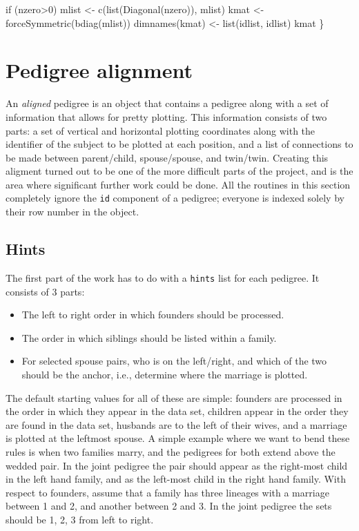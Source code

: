 \documentclass{article}
\begin{document}
    if (nzero>0) mlist <- c(list(Diagonal(nzero)), mlist)
    kmat <- forceSymmetric(bdiag(mlist))
    dimnames(kmat) <- list(idlist, idlist)
    kmat
\}
\nwendcode{}\nwdocspar




\section{Pedigree alignment}
An \emph{aligned} pedigree is an object that contains a pedigree along
with a set of information that allows for pretty plotting.
This information consists of two parts: 
a set of vertical and horizontal plotting coordinates along with the
identifier of the subject to be plotted at each position,
and a list of connections to be made between parent/child, spouse/spouse,
and twin/twin.
Creating this aligment turned out to be one of the more difficult parts
of the project, and is the area where significant further work could be
done.  
All the routines in this section completely ignore the {\tt{}id} component
of a pedigree; everyone is indexed solely by their row number in the object.

\subsection{Hints}

The first part of the work has to do with a {\tt{}hints} list for each
pedigree.  It consists of 3 parts:
\begin{itemize}
  \item The left to right order in which founders should be processed.
  \item The order in which siblings should be listed within a family.
  \item For selected spouse pairs, who is on the left/right, and which of the
    two should be the anchor, i.e., determine where the marriage is plotted.
    \end{itemize}
The default starting values for all of these are simple: founders are 
processed in the order in which they appear in the data set, 
children appear in the order they are found in the data set,
husbands are to the left of their wives, and a marriage is plotted
at the leftmost spouse.
A simple example where we want to bend these rules is when two families
marry, and the pedigrees for both extend above the wedded pair.  
In the joint pedigree the
pair should appear as the right-most child in the left hand family, and
as the left-most child in the right hand family.
With respect to founders, assume that a family has three lineages with
a marriage between 1 and 2, and another between 2 and 3.  In the joint
pedigree the sets should be 1, 2, 3 from left to right.  
\end{document}
